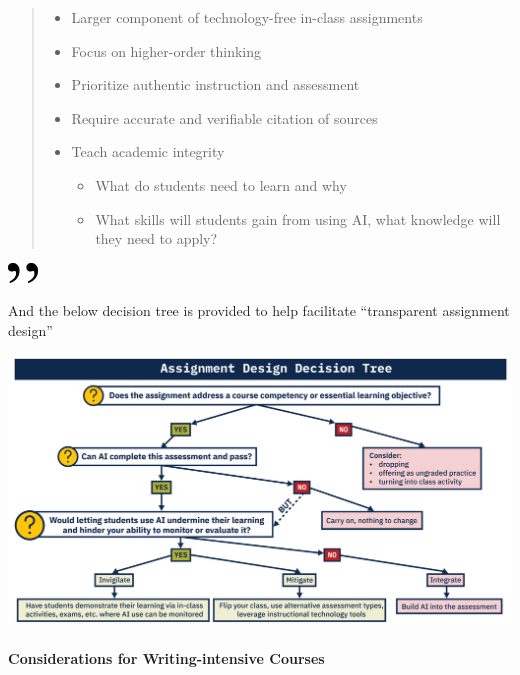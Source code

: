 \documentclass[
]{book}
\begin{document}
\begin{quote}
\begin{itemize}
\item
  Larger component of technology-free in-class assignments
\item
  Focus on higher-order thinking
\item
  Prioritize authentic instruction and assessment
\item
  Require accurate and verifiable citation of sources
\item
  Teach academic integrity

  \begin{itemize}
  \item
    What do students need to learn and why
  \item
    What skills will students gain from using AI, what knowledge will they need to apply?
  \end{itemize}
\end{itemize}
\end{quote}

\includegraphics[width=0.3125in,height=0.20833in]{close.png}

And the below decision tree is provided to help facilitate ``transparent assignment design''

\includegraphics{dec_tree.png}

\hypertarget{considerations-for-writing-intensive-courses}{%
\paragraph*{Considerations for Writing-intensive Courses}\label{considerations-for-writing-intensive-courses}}
\end{document}
